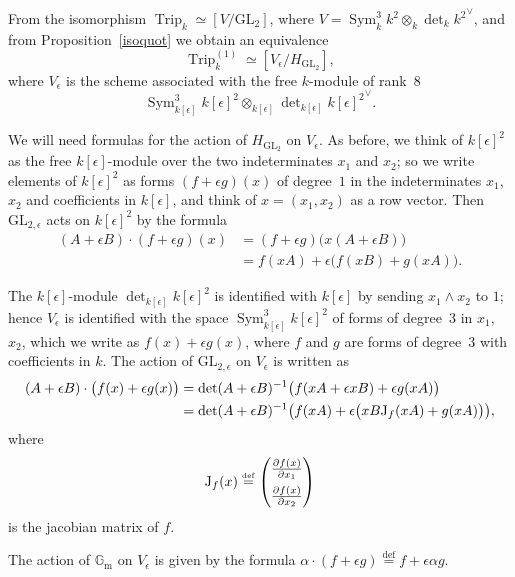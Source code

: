 \documentclass{amsart}
\numberwithin{equation}{section}
\numberwithin{subsection}{section}
\theoremstyle{definition}
\theoremstyle{remark}
\newcommand\eqdef{\overset{\mathrm{\scriptscriptstyle def}} =}
\newcommand{\trip}{\operatorname{Trip}}
\newcommand{\GL}{\mathrm{GL}}
\newcommand{\gm}{\mathbb{G}_{\mathrm{m}}}
\newcommand{\sym}{\operatorname{Sym}}
\newcommand{\symthree}[2][]{\sym^{3}_{{#1}}{#2} \otimes_{{#1}} \det\nolimits_{{#1}} {#2}\dual}
\newcommand{\GLe}{\GL_{2, \epsilon}}
\newcommand{\dual}{^{\vee}}
\newcommand\Hg{H_{\GL_2}}
\newcommand\Ve{V_{\epsilon}}
\begin{document}
From the isomorphism $\trip_{k} \simeq [V/\GL_{2}]$, where $V = \symthree[k]{k^{2}}$, and from Proposition~\ref{isoquot} we obtain an equivalence
   \[
   \trip_{k}^{(1)} \simeq [\Ve/\Hg],
   \]
where $\Ve$ is the scheme associated with the free  $k$-module of rank~$8$
   \[
   \symthree[{k[\epsilon]}] {k[\epsilon]^{2}}.
   \]

We will need formulas for the action of $\Hg$ on $\Ve$. As before, we think of $k[\epsilon]^{2}$ as the free $k[\epsilon]$-module over the two indeterminates $x_{1}$ and $x_{2}$; so we write elements of $k[\epsilon]^{2}$ as forms $(f+\epsilon g)(x)$ of degree~$1$ in the indeterminates $x_{1}$, $x_{2}$ and coefficients in $k[\epsilon]$, and think of $x = (x_{1}, x_{2})$ as a row vector. Then $\GLe$ acts on $k[\epsilon]^{2}$ by the formula
   \begin{align*}
   (A + \epsilon B) \cdot (f + \epsilon g)(x) &=
      (f + \epsilon g)\bigl(x(A + \epsilon B)\bigr)\\
      &= f(xA) + \epsilon\bigl(f(xB) + g(xA)\bigr).
   \end{align*}

The $k[\epsilon]$-module $\det_{k[\epsilon]}k[\epsilon]^{2}$ is identified with $k[\epsilon]$ by sending $x_{1} \wedge x_{2}$ to $1$; hence $\Ve$ is identified with the space $\sym^{3}_{k[\epsilon]}k[\epsilon]^{2}$ of forms of degree~$3$ in $x_{1}$, $x_{2}$, which we write as $f(x) + \epsilon g(x)$, where $f$ and $g$ are forms of degree~$3$ with coefficients in $k$. The action of $\GLe$ on $\Ve$ is written as
   \begin{align*}
   (A + \epsilon B) \cdot\bigl(f(x) + \epsilon g(x)\bigr) &=
    \det(A + \epsilon B)^{-1}
    \bigl(f(xA + \epsilon xB) + \epsilon g(xA)\bigr)\\
   &= \det(A + \epsilon B)^{-1}\bigl(f(xA) + \epsilon\bigl(xB \mathrm{J}_{f}(xA)
      + g(xA)\bigr)\bigr),
   \end{align*}
where
   \[
   \rJ_{f}(x)\eqdef 
   \begin{pmatrix}
   \frac{\partial f(x)}{\partial x_{1}}\\\vspace*{-7pt}\\
   \frac{\partial f(x)}{\partial x_{2}}
   \end{pmatrix}
   \]
is the jacobian matrix of $f$.


The action of $\gm$ on $\Ve$ is given by the formula $ \alpha\cdot(f + \epsilon g) \eqdef f + \epsilon \alpha g$.
\end{document}
